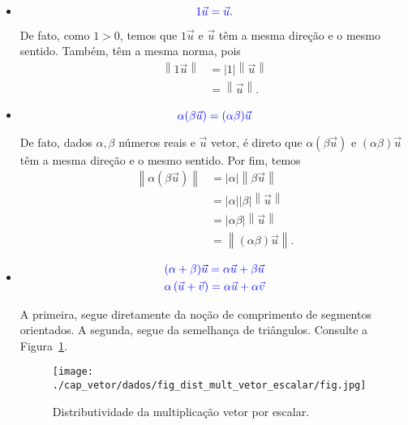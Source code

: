 \begin{itemize}
  \item {}
  \begin{equation}\color{blue}1\vec{u} = \vec{u}.
  \end{equation}

  De fato, como $1 > 0$, temos que $1\vec{u}$ e $\vec{u}$ têm a mesma direção e o mesmo sentido. Também, têm a mesma norma, pois
  \begin{align}
    \left\|1\vec{u}\right\| &= |1|\left\|\vec{u}\right\|\\
    &=  \left\|\vec{u}\right\|.
  \end{align}

  \item {}
  \begin{equation}\color{blue}\alpha(\beta\vec{u}) = (\alpha\beta)\vec{u}
  \end{equation}

  De fato, dados $\alpha,\beta$ números reais e $\vec{u}$ vetor, é direto que $\alpha(\beta\vec{u})$ e $(\alpha\beta)\vec{u}$ têm a mesma direção e o mesmo sentido. Por fim, temos
  \begin{align}
    \left\|\alpha(\beta\vec{u})\right\| &= \left|\alpha\right|\left\|\beta\vec{u}\right\|\\
    &= \left|\alpha\right|\left|\beta\right|\left\|\vec{u}\right\|\\
    &= \left|\alpha\beta\right|\left\|\vec{u}\right\|\\
    &= \left\|(\alpha\beta)\vec{u}\right\|.
  \end{align}

  \item {}
    \begin{align}
      &\color{blue}(\alpha + \beta)\vec{u} = \alpha\vec{u} + \beta\vec{u}\\
      &\color{blue}\alpha\left(\vec{u}+\vec{v}\right) = \alpha\vec{u} + \alpha\vec{v}
    \end{align}

    A primeira, segue diretamente da noção de comprimento de segmentos orientados. A segunda, segue da semelhança de triângulos. Consulte a Figura~\ref{cap_vetor_sec_op:fig:distributividade}.

    \begin{figure}[h]
      \centering
      \texttt{[image: ./cap\_vetor/dados/fig\_dist\_mult\_vetor\_escalar/fig.jpg]}
      \caption{Distributividade da multiplicação vetor por escalar.}
      \label{cap_vetor_sec_op:fig:distributividade}
    \end{figure}

\end{itemize}

